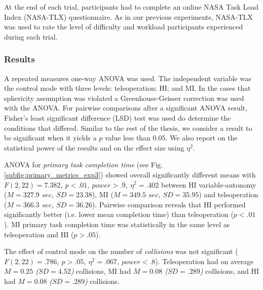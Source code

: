 \documentclass[a4paper,12pt,oneside,openright]{bhamthesis}
\begin{document}
At the end of each trial, participants had to complete an online NASA Task Load Index (NASA-TLX) questionnaire. As in our previous experiments, NASA-TLX was used to rate the level of difficulty and workload participants experienced during each trial.


\subsubsection{Results}
A repeated measures one-way ANOVA was used. The independent variable was the control mode with three levels: teleoperation; HI; and MI. In the cases that sphericity assumption was violated a Greenhouse-Geisser correction was used with the ANOVA. For pairwise comparisons after a significant ANOVA result, Fisher's least significant difference (LSD) test was used do determine the conditions that differed. Similar to the rest of the thesis, we consider a result to be significant when it yields a $p$ value less than $0.05$. We also report on the statistical power of the results and on the effect size using $\eta^2$. 

ANOVA for \textit{primary task completion time} (see Fig. \ref{subfig:primary_metrics_exp3}) showed overall significantly different means with \textit{$F(2, 22) = 7.382$,  $p < .01$, $power > .9$, $\eta^2 = .402$} between HI variable-autonomy (\textit{$M = 327.9$ $sec$, $SD = 23.38$}), MI (\textit{$M = 349.5$ $sec$, $SD = 35.95$}) and teleoperation (\textit{$M = 366.3$ $sec$, $SD = 36.26$}). Pairwise comparison reveals that HI performed significantly better (i.e. lower mean completion time) than teleoperation (\textit{$p < .01$}). MI primary task completion time was statistically in the same level as teleoperation and HI (\textit{$p > .05$}).
 
The effect of control mode on the number of \textit{collisions} was not significant (\textit{$F(2, 22) = .786$, $p > .05$, $\eta^2 = .067$, $power < .8$}). Teleoperation had on average \textit{$M = 0.25$ ($SD = 4.52$)} collisions, MI had \textit{$M = 0.08$ ($SD = .289$)} collisions, and HI had \textit{$M = 0.08$ ($SD = .289$)} collisions.
\end{document}
